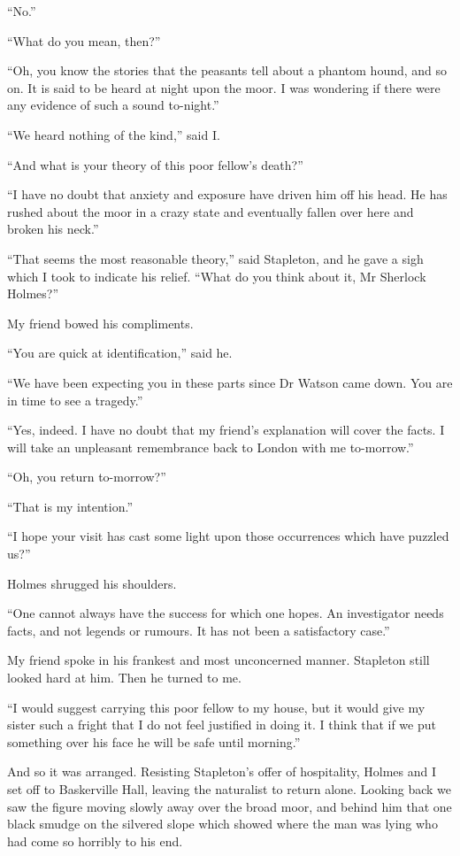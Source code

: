 \documentclass[paper=a5,BCOR=7mm,twoside,DIV=calc,12pt,usegeometry,openany,chapterprefix,endperiod,headings=big]{scrbook} %
\begin{document}
\enquote{No.}

\enquote{What do you mean, then?}

\enquote{Oh, you know the stories that the peasants tell about a phantom hound, and so on. It is said to be heard at night upon the moor. I was wondering if there were any evidence of such a sound to-night.}

\enquote{We heard nothing of the kind,} said I.

\enquote{And what is your theory of this poor fellow's death?}

\enquote{I have no doubt that anxiety and exposure have driven him off his head. He has rushed about the moor in a crazy state and eventually fallen over here and broken his neck.}

\enquote{That seems the most reasonable theory,} said Stapleton, and he gave a sigh which I took to indicate his relief. \enquote{What do you think about it, Mr Sherlock Holmes?}

My friend bowed his compliments.

\enquote{You are quick at identification,} said he.

\enquote{We have been expecting you in these parts since Dr Watson came down. You are in time to see a tragedy.}

\enquote{Yes, indeed. I have no doubt that my friend's explanation will cover the facts. I will take an unpleasant remembrance back to London with me to-morrow.}

\enquote{Oh, you return to-morrow?}

\enquote{That is my intention.}

\enquote{I hope your visit has cast some light upon those occurrences which have puzzled us?}

Holmes shrugged his shoulders.

\enquote{One cannot always have the success for which one hopes. An investigator needs facts, and not legends or rumours. It has not been a satisfactory case.}

My friend spoke in his frankest and most unconcerned manner. Stapleton still looked hard at him. Then he turned to me.

\enquote{I would suggest carrying this poor fellow to my house, but it would give my sister such a fright that I do not feel justified in doing it. I think that if we put something over his face he will be safe until morning.}

And so it was arranged. Resisting Stapleton's offer of hospitality, Holmes and I set off to Baskerville Hall, leaving the naturalist to return alone. Looking back we saw the figure moving slowly away over the broad moor, and behind him that one black smudge on the silvered slope which showed where the man was lying who had come so horribly to his end.
\end{document}

